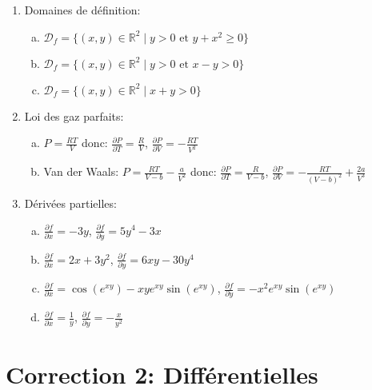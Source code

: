\begin{enumerate}
    \item Domaines de définition:
    \begin{enumerate}[a)]
        \item $\mathcal{D}_f = \{(x, y) \in \mathbb{R}^2 \mid y > 0 \text{ et } y + x^2 \geq 0\}$
        \item $\mathcal{D}_f = \{(x, y) \in \mathbb{R}^2 \mid y > 0 \text{ et } x - y > 0\}$
        \item $\mathcal{D}_f = \{(x, y) \in \mathbb{R}^2 \mid x + y > 0\}$
    \end{enumerate}

    \item Loi des gaz parfaits:
    \begin{enumerate}[a)]
        \item $P = \frac{RT}{V}$ donc:
        $\frac{\partial P}{\partial T} = \frac{R}{V}$, $\frac{\partial P}{\partial V} = -\frac{RT}{V^2}$
        
        \item Van der Waals: $P = \frac{RT}{V-b} - \frac{a}{V^2}$ donc:
        $\frac{\partial P}{\partial T} = \frac{R}{V-b}$, $\frac{\partial P}{\partial V} = -\frac{RT}{(V-b)^2} + \frac{2a}{V^3}$
    \end{enumerate}

    \item Dérivées partielles:
    \begin{enumerate}[a)]
        \item $\frac{\partial f}{\partial x} = -3y$, $\frac{\partial f}{\partial y} = 5y^4 - 3x$
        \item $\frac{\partial f}{\partial x} = 2x + 3y^2$, $\frac{\partial f}{\partial y} = 6xy - 30y^4$
        \item $\frac{\partial f}{\partial x} = \cos(e^{xy}) - xye^{xy}\sin(e^{xy})$, $\frac{\partial f}{\partial y} = -x^2e^{xy}\sin(e^{xy})$
        \item $\frac{\partial f}{\partial x} = \frac{1}{y}$, $\frac{\partial f}{\partial y} = -\frac{x}{y^2}$
    \end{enumerate}
\end{enumerate}

\section*{Correction 2: Différentielles}

